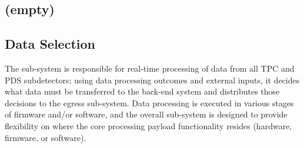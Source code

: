 





\subsection{(empty)}



\subsection{Data Selection}
\label{sec:sp-daq:design-selection-algs}

The  sub-system is responsible for real-time processing
of data from all TPC and PDS subdetectors; using data processing
outcomes and external inputs, it decides
what data must be transferred to the back-end system and
distributes those decisions to the egress sub-system. Data processing
is executed in various stages of firmware and/or 
software, and the overall sub-system is designed to
provide flexibility on where the core processing payload functionality
resides (hardware, firmware, or software). 


